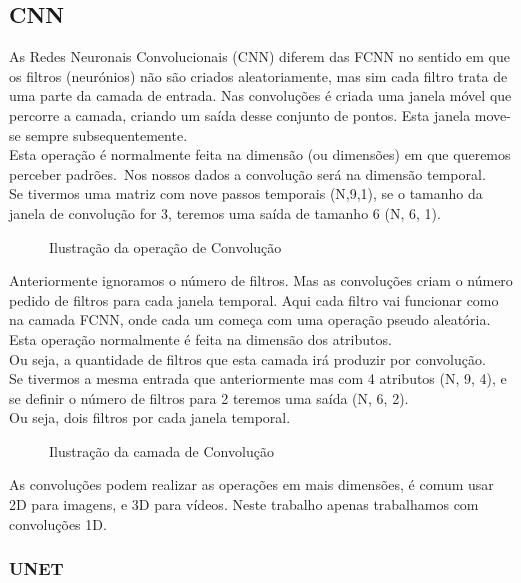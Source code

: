 \subsection{CNN\label{se:cnn_sec}}
As Redes Neuronais Convolucionais (\gls{CNN}) diferem das \gls{FCNN} no sentido em que os filtros (neurónios) não são criados aleatoriamente, mas sim cada filtro trata de uma parte da camada de entrada. Nas convoluções é criada uma janela móvel que percorre a camada, criando um saída desse conjunto de pontos. Esta janela move-se sempre subsequentemente.\\
Esta operação é normalmente feita na dimensão (ou dimensões) em que queremos perceber padrões.\
Nos nossos dados a convolução será na dimensão temporal.\\
Se tivermos uma matriz com nove passos temporais (N,9,1), se o tamanho da janela de convolução for 3, teremos uma saída de tamanho 6 (N, 6, 1).\\
\begin{figure}[H]
	\centering
	\resizebox{\linewidth}{!}{}
	\caption{Ilustração da operação de Convolução}
	\label{fig:conv_layer1D}
\end{figure}

Anteriormente ignoramos o número de filtros. Mas as convoluções criam o número pedido de filtros para cada janela temporal. Aqui cada filtro vai funcionar como na camada \gls{FCNN}, onde cada um começa com uma operação pseudo aleatória. Esta operação normalmente é feita na dimensão dos atributos.\\
Ou seja, a quantidade de filtros que esta camada irá produzir por convolução.\\
Se tivermos a mesma entrada que anteriormente mas com 4 atributos (N, 9, 4), e se definir o número de filtros para 2 teremos uma saída (N, 6, 2).\\
Ou seja, dois filtros por cada janela temporal.\\


\begin{figure}[H]
	\centering
	\resizebox{\linewidth}{!}{}
	\caption{Ilustração da camada de Convolução}
	\label{fig:conv_layer}
\end{figure}

As convoluções podem realizar as operações em mais dimensões, é comum usar 2D para imagens, e 3D para vídeos. Neste trabalho apenas trabalhamos com convoluções 1D.\\

\subsubsection{UNET\label{se:unet_sec}}

